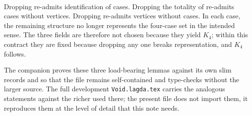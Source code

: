 \documentclass[11pt]{article}
\begin{document}
\begin{code}%
\>[0]\<%
\\
\>[0]\AgdaSpace{}%
\AgdaSymbol{:}\<%
\\
\>[0][@{}l@{\AgdaIndent{0}}]%
\>[2]\AgdaSymbol{(}\AgdaSpace{}%
\AgdaSymbol{:}\AgdaSpace{}%
\AgdaSymbol{)}\AgdaSpace{}%
\<%
\\
%
\>[2]\AgdaSymbol{(}\AgdaSpace{}%
\AgdaSymbol{:}\AgdaSpace{}%
\AgdaSpace{}%
\AgdaSymbol{(}\AgdaSpace{}%
\AgdaSymbol{))}\AgdaSpace{}%
\<%
\\
%
\>[2]%
\>[2126I]\<%
\\
\>[.][@{}l@{}]\<[2126I]%
\>[4]\AgdaSpace{}%
\AgdaSpace{}%
\AgdaSpace{}%
\AgdaSpace{}%
\AgdaSymbol{(}\AgdaSpace{}%
\AgdaSymbol{)}\AgdaSpace{}%
\AgdaSpace{}%
\AgdaSpace{}%
\AgdaSymbol{)}\<%
\\
\>[0]\AgdaSpace{}%
\AgdaSpace{}%
\AgdaSpace{}%
\AgdaSymbol{=}\AgdaSpace{}%
\AgdaSpace{}%
\AgdaSpace{}%
\<%
\end{code}

Dropping  re-admits identification of
cases.  Dropping the totality of  re-admits cases
without vertices.  Dropping  re-admits vertices
without cases.  In each case, the remaining structure no longer
represents the four-case set in the intended sense.  The three
fields are therefore not chosen because they yield $K_4$; within this
contract they are fixed because dropping any one breaks representation,
and $K_4$ follows.

The companion proves these three load-bearing lemmas against its own
slim records  and 
so that the file remains self-contained and type-checks without the
larger source.  The full development \texttt{Void.lagda.tex} carries
the analogous statements against the richer  used
there; the present file does not import them, it reproduces them at
the level of detail that this note needs.
\end{document}
